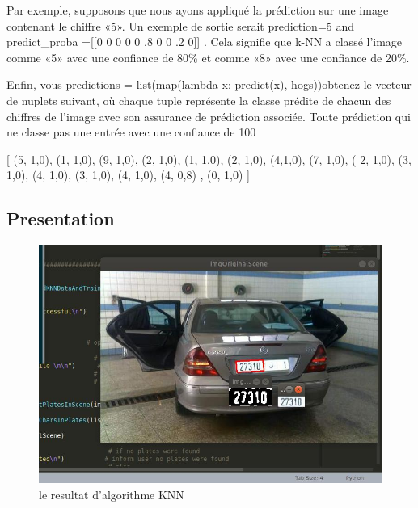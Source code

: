 \documentclass[11pt]{report}
\begin{document}
Par exemple, supposons que nous ayons appliqué la prédiction sur une image contenant le chiffre «5». Un exemple de sortie serait prediction=5 and predict\_proba =[[0 0 0 0 0 .8 0 0 .2 0]] . Cela signifie que k-NN a classé l'image comme «5» avec une confiance de 80\% et comme «8» avec une confiance de 20\%.

Enfin, vous predictions = list(map(lambda x: predict(x), hogs))obtenez le vecteur de nuplets suivant, où chaque tuple représente la classe prédite de chacun des chiffres de l'image avec son assurance de prédiction associée. Toute prédiction qui ne classe pas une entrée avec une confiance de 100%

[ 
(5, 1,0), (1, 1,0), (9, 1,0), (2, 1,0), (1, 1,0), (2, 1,0), (4,1,0), (7, 1,0), ( 2, 1,0), (3, 1,0), (4, 1,0), (3, 1,0), (4, 1,0), 
(4, 0,8) , (0, 1,0) 
]

\subsection{Presentation}
\begin{figure}[H]
	\begin{center}
		\includegraphics[width=12cm]{images/OCR.png}
		\caption{le resultat d'algorithme KNN}
		\label{fig:figure}
	\end{center}
\end{figure}

%
%
\end{document}
